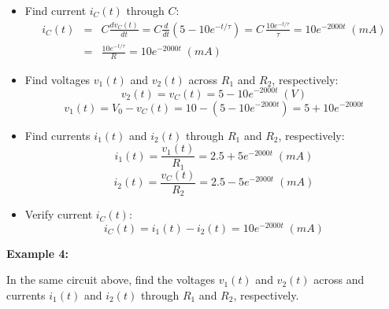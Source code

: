 \documentclass{article}
\begin{document}
\begin{itemize}
\item Find current $i_C(t)$ through $C$:
  \begin{eqnarray}
    i_C(t)&=&C\frac{dv_C(t)}{dt}=C\frac{d}{dt}(5-10 e^{-t/\tau})
    =C\,\frac{10 e^{-t/\tau}}{\tau}=10 e^{-2000 t}\;(mA)	
    \nonumber \\
    &=&\frac{10 e^{-t/\tau}}{R}=10 e^{-2000 t}\;(mA)	
  \end{eqnarray}
\item Find voltages $v_1(t)$ and $v_2(t)$ across $R_1$ and $R_2$,
  respectively:
  \begin{equation} 
    v_2(t)=v_C(t)=5-10 e^{-2000t}\;(V)	
  \end{equation}
  \begin{equation} 
    v_1(t)=V_0-v_C(t)=10-(5-10 e^{-2000t})=5+10 e^{-2000t} 
  \end{equation}
\item Find currents $i_1(t)$ and $i_2(t)$ through $R_1$ and $R_2$, 
  respectively:
  \begin{equation}
    i_1(t)=\frac{v_1(t)}{R_1}=2.5+5 e^{-2000t} \; (mA)	
  \end{equation}
  \begin{equation}
    i_2(t)=\frac{v_C(t)}{R_2}=2.5-5 e^{-2000t}\; (mA)	
  \end{equation}
\item Verify current $i_C(t)$:
  \begin{equation}
    i_C(t)=i_1(t)-i_2(t)=10 e^{-2000t} \; (mA)	
  \end{equation}
\end{itemize}


{\bf Example 4:}

In the same circuit above, find the voltages $v_1(t)$ and $v_2(t)$ 
across and currents $i_1(t)$ and $i_2(t)$ through $R_1$ and $R_2$, 
respectively.

\end{document}
